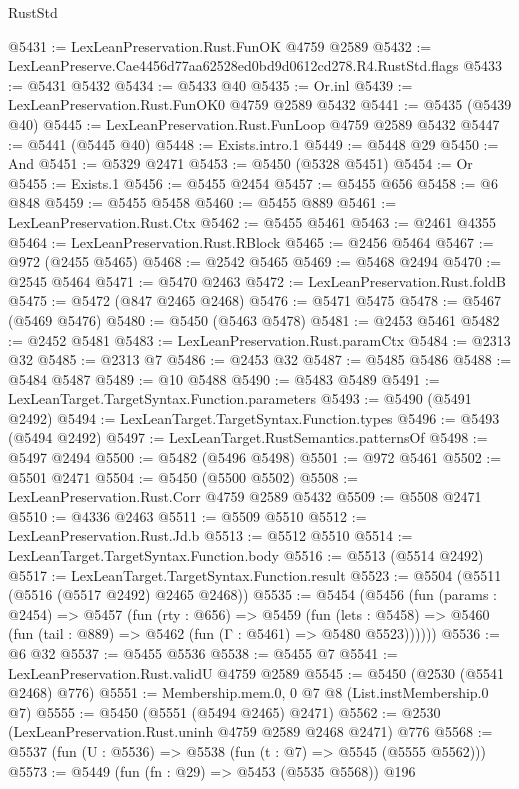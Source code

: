 \begin{lexlean}{RustStd}
\begin{coremodule}
@5431 := LexLeanPreservation.Rust.FunOK @4759 @2589
@5432 := LexLeanPreserve.Cae4456d77aa62528ed0bd9d0612cd278.R4.RustStd.flags
@5433 := @5431 @5432
@5434 := @5433 @40
@5435 := Or.inl
@5439 := LexLeanPreservation.Rust.FunOK0 @4759 @2589 @5432
@5441 := @5435 (@5439 @40)
@5445 := LexLeanPreservation.Rust.FunLoop @4759 @2589 @5432
@5447 := @5441 (@5445 @40)
@5448 := Exists.intro.{1}
@5449 := @5448 @29
@5450 := And
@5451 := @5329 @2471
@5453 := @5450 (@5328 @5451)
@5454 := Or
@5455 := Exists.{1}
@5456 := @5455 @2454
@5457 := @5455 @656
@5458 := @6 @848
@5459 := @5455 @5458
@5460 := @5455 @889
@5461 := LexLeanPreservation.Rust.Ctx
@5462 := @5455 @5461
@5463 := @2461 @4355
@5464 := LexLeanPreservation.Rust.RBlock
@5465 := @2456 @5464
@5467 := @972 (@2455 @5465)
@5468 := @2542 @5465
@5469 := @5468 @2494
@5470 := @2545 @5464
@5471 := @5470 @2463
@5472 := LexLeanPreservation.Rust.foldB
@5475 := @5472 (@847 @2465 @2468)
@5476 := @5471 @5475
@5478 := @5467 (@5469 @5476)
@5480 := @5450 (@5463 @5478)
@5481 := @2453 @5461
@5482 := @2452 @5481
@5483 := LexLeanPreservation.Rust.paramCtx
@5484 := @2313 @32
@5485 := @2313 @7
@5486 := @2453 @32
@5487 := @5485 @5486
@5488 := @5484 @5487
@5489 := @10 @5488
@5490 := @5483 @5489
@5491 := LexLeanTarget.TargetSyntax.Function.parameters
@5493 := @5490 (@5491 @2492)
@5494 := LexLeanTarget.TargetSyntax.Function.types
@5496 := @5493 (@5494 @2492)
@5497 := LexLeanTarget.RustSemantics.patternsOf
@5498 := @5497 @2494
@5500 := @5482 (@5496 @5498)
@5501 := @972 @5461
@5502 := @5501 @2471
@5504 := @5450 (@5500 @5502)
@5508 := LexLeanPreservation.Rust.Corr @4759 @2589 @5432
@5509 := @5508 @2471
@5510 := @4336 @2463
@5511 := @5509 @5510
@5512 := LexLeanPreservation.Rust.Jd.b
@5513 := @5512 @5510
@5514 := LexLeanTarget.TargetSyntax.Function.body
@5516 := @5513 (@5514 @2492)
@5517 := LexLeanTarget.TargetSyntax.Function.result
@5523 := @5504 (@5511 (@5516 (@5517 @2492) @2465 @2468))
@5535 := @5454
    (@5456
      (fun (params : @2454) =>
      @5457
        (fun (rty : @656) =>
        @5459
          (fun (lets : @5458) =>
          @5460 (fun (tail : @889) => @5462 (fun (Γ : @5461) => @5480 @5523))))))
@5536 := @6 @32
@5537 := @5455 @5536
@5538 := @5455 @7
@5541 := LexLeanPreservation.Rust.validU @4759 @2589
@5545 := @5450 (@2530 (@5541 @2468) @776)
@5551 := Membership.mem.{0, 0} @7 @8 (List.instMembership.{0} @7)
@5555 := @5450 (@5551 (@5494 @2465) @2471)
@5562 := @2530 (LexLeanPreservation.Rust.uninh @4759 @2589 @2468 @2471) @776
@5568 := @5537 (fun (U : @5536) => @5538 (fun (t : @7) => @5545 (@5555 @5562)))
@5573 := @5449 (fun (fn : @29) => @5453 (@5535 @5568)) @196

\end{coremodule}
\end{lexlean}
